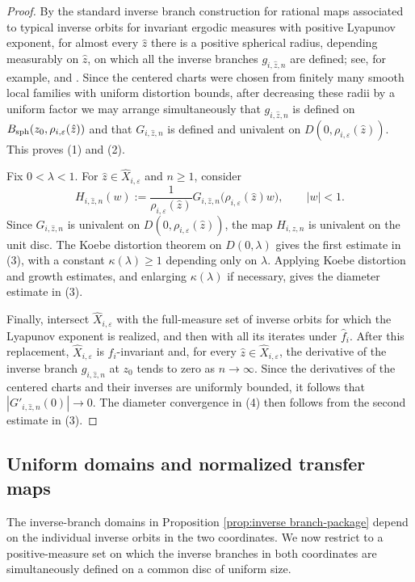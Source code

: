 \documentclass[11pt]{amsart}
\numberwithin{equation}{section}
\theoremstyle{plain}
\theoremstyle{definition}
\theoremstyle{remark}
\begin{document}
\begin{proof}
By the standard inverse branch construction for rational maps
associated to typical inverse orbits for invariant ergodic measures
with positive Lyapunov exponent, for almost every $\hat z$ there is
a positive spherical radius, depending measurably on $\hat z$, on
which all the inverse branches $g_{i,\hat z,n}$ are defined; see,
for example, \cite[Chapter 11]{PUbook} and \cite{Berteloot10}.
Since the centered charts were chosen from finitely many smooth
local families with uniform distortion bounds, after decreasing
these radii by a uniform factor we may arrange simultaneously that
$g_{i,\hat z,n}$ is defined on
$B_{\rm sph}(z_0,\rho_{i,\varepsilon}(\hat z))$ and that
$G_{i,\hat z,n}$ is defined and univalent on
$D(0,\rho_{i,\varepsilon}(\hat z))$.
This proves (1) and (2).

Fix $0<\lambda<1$. For
$\hat z\in\hat X_{i,\varepsilon}$ and $n\geq1$, consider
$$
H_{i,\hat z,n}(w)
:=
\frac{1}{\rho_{i,\varepsilon}(\hat z)}
G_{i,\hat z,n}
\bigl(\rho_{i,\varepsilon}(\hat z)w\bigr),
\qquad |w|<1.
$$
Since $G_{i,\hat z,n}$ is univalent on
$D(0,\rho_{i,\varepsilon}(\hat z))$, the map
$H_{i,\hat z,n}$ is univalent on the unit disc. The Koebe distortion
theorem on $D(0,\lambda)$ 
gives the first
estimate in (3), with a constant $\kappa(\lambda)\ge1$ depending
only on $\lambda$.
Applying 
Koebe distortion and growth estimates,
and enlarging
$\kappa(\lambda)$ if necessary, gives the diameter estimate in (3).

Finally, intersect $\hat X_{i,\varepsilon}$ with the
full-measure set of inverse orbits for which the Lyapunov exponent
is realized, and then with all its iterates under $\hat f_i$.
After this replacement, $\hat X_{i,\varepsilon}$ is
$\hat f_i$-invariant and, for every
$\hat z\in\hat X_{i,\varepsilon}$, the derivative of the
inverse branch $g_{i,\hat z,n}$ at $z_0$ tends to zero as
$n\to\infty$. Since the derivatives of the centered charts and
their inverses are uniformly bounded, it follows that
$|G'_{i,\hat z,n}(0)|\to0$. The diameter convergence in (4)
then follows from the second estimate in (3).
\end{proof}


\subsection{Uniform domains and normalized transfer maps}
\label{subsec:normalized-transfer}
The inverse-branch domains in Proposition
\ref{prop:inverse branch-package} depend on the individual inverse
orbits in the two coordinates. We now restrict to a positive-measure
set on which the inverse branches in both coordinates are
simultaneously defined on a common disc of uniform size.
\end{document}
